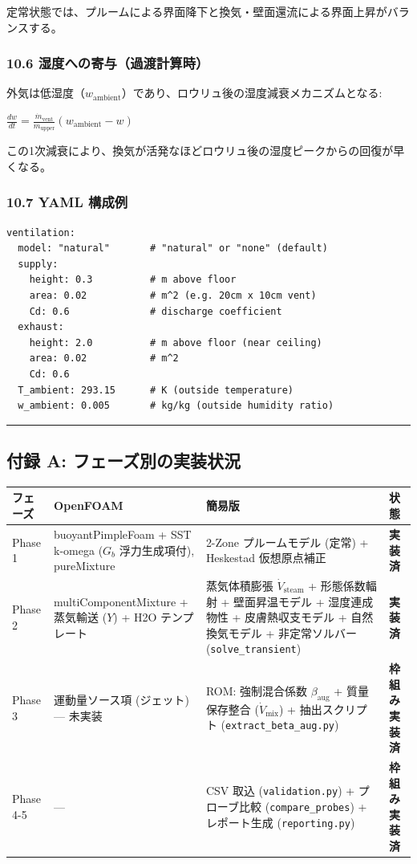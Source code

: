 \documentclass[a4paper,11pt]{article}
\begin{document}
定常状態では、プルームによる界面降下と換気・壁面還流による界面上昇がバランスする。

\subsubsection{10.6 湿度への寄与（過渡計算時）}

外気は低湿度（$w_{\text{ambient}}$）であり、ロウリュ後の湿度減衰メカニズムとなる:

$
\frac{dw}{dt} = \frac{\dot{m}_{\text{vent}}}{m_{\text{upper}}} (w_{\text{ambient}} - w)
$

この1次減衰により、換気が活発なほどロウリュ後の湿度ピークからの回復が早くなる。

\subsubsection{10.7 YAML 構成例}

\begin{verbatim}
ventilation:
  model: "natural"       # "natural" or "none" (default)
  supply:
    height: 0.3          # m above floor
    area: 0.02           # m^2 (e.g. 20cm x 10cm vent)
    Cd: 0.6              # discharge coefficient
  exhaust:
    height: 2.0          # m above floor (near ceiling)
    area: 0.02           # m^2
    Cd: 0.6
  T_ambient: 293.15      # K (outside temperature)
  w_ambient: 0.005       # kg/kg (outside humidity ratio)
\end{verbatim}

\bigskip\hrule\bigskip

\subsection{付録 A: フェーズ別の実装状況}

{\small
\noindent
\begin{tabularx}{\textwidth}{|l|L|L|L|}
\hline
\textbf{フェーズ} & \textbf{OpenFOAM} & \textbf{簡易版} & \textbf{状態} \\
\hline
Phase 1 & buoyantPimpleFoam + SST k-omega ($G_b$ 浮力生成項付), pureMixture & 2-Zone プルームモデル (定常) + Heskestad 仮想原点補正 & \textbf{実装済} \\
\hline
Phase 2 & multiComponentMixture + 蒸気輸送 ($Y$) + H2O テンプレート & 蒸気体積膨張 $\dot{V}_{\text{steam}}$ + 形態係数輻射 + 壁面昇温モデル + 湿度連成物性 + 皮膚熱収支モデル + 自然換気モデル + 非定常ソルバー (\texttt{solve\_transient}) & \textbf{実装済} \\
\hline
Phase 3 & 運動量ソース項 (ジェット) — 未実装 & ROM: 強制混合係数 $\beta_{\text{aug}}$ + 質量保存整合 ($\dot{V}_{\text{mix}}$) + 抽出スクリプト (\texttt{extract\_beta\_aug.py}) & \textbf{枠組み実装済} \\
\hline
Phase 4-5 & — & CSV 取込 (\texttt{validation.py}) + プローブ比較 (\texttt{compare\_probes}) + レポート生成 (\texttt{reporting.py}) & \textbf{枠組み実装済} \\
\hline
\end{tabularx}
}
\end{document}
